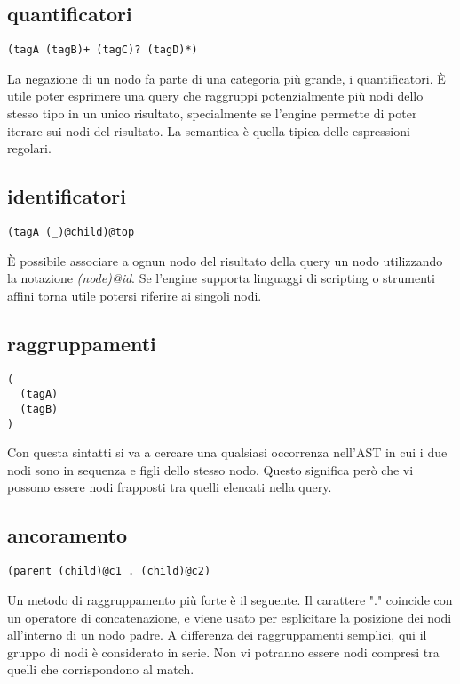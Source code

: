 \subsection{quantificatori}

\begin{lstlisting}
(tagA (tagB)+ (tagC)? (tagD)*)
\end{lstlisting}

La negazione di un nodo fa parte di una categoria pi\`u grande, i quantificatori.
\`E utile poter esprimere una query che raggruppi potenzialmente pi\`u nodi dello stesso tipo in un unico risultato, specialmente se l'engine permette di poter iterare sui nodi del risultato.
La semantica \`e quella tipica delle espressioni regolari.

\subsection{identificatori}

\begin{lstlisting}
(tagA (_)@child)@top
\end{lstlisting}

\`E possibile associare a ognun nodo del risultato della query un nodo utilizzando la notazione \emph{(node)@id}.
Se l'engine supporta linguaggi di scripting o strumenti affini torna utile potersi riferire ai singoli nodi.

\subsection{raggruppamenti}

\begin{lstlisting}
(
  (tagA)
  (tagB)
)
\end{lstlisting}

Con questa sintatti si va a cercare una qualsiasi occorrenza nell'AST in cui i due nodi sono in sequenza e figli dello stesso nodo.
Questo significa per\`o che vi possono essere nodi frapposti tra quelli elencati nella query.

\subsection{ancoramento}

\begin{lstlisting}
(parent (child)@c1 . (child)@c2)
\end{lstlisting}

Un metodo di raggruppamento pi\`u forte \`e il seguente.
Il carattere "." coincide con un operatore di concatenazione, e viene usato per esplicitare la posizione dei nodi all'interno di un nodo padre.
A differenza dei raggruppamenti semplici, qui il gruppo di nodi \`e considerato in serie.
Non vi potranno essere nodi compresi tra quelli che corrispondono al match.

